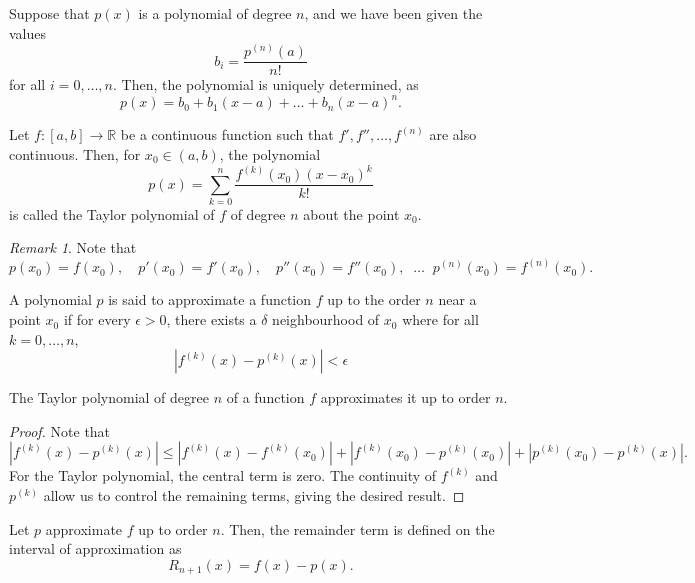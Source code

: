 \documentclass[11pt]{article}
\def\R{\mathbb{R}}
\theoremstyle{definition}
\theoremstyle{remark}
\newtheorem*{remark}{Remark}
\numberwithin{equation}{module}
\begin{document}
    \begin{lemma}
        Suppose that $p(x)$ is a polynomial of degree $n$, and we have been given the
        values \[
            b_i = \frac{p^{(n)}(a)}{n!}
        \] for all $i = 0, \dots, n$. Then, the polynomial is uniquely determined,
        as \[
            p(x) = b_0 + b_1(x - a) + \dots + b_n(x - a)^n.
        \] 
    \end{lemma}

    \begin{definition}
        Let $f\colon [a, b] \to \R$ be a continuous function such that $f', f'',
        \dots, f^{(n)}$ are also continuous. Then, for $x_0 \in (a, b)$, 
        the polynomial \[
            p(x) = \sum_{k = 0}^n \frac{f^{(k)}(x_0)(x - x_0)^k}{k!}
        \] is called the Taylor polynomial of $f$ of degree $n$ about the point
        $x_0$.
        \begin{remark}
            Note that \[
                p(x_0) = f(x_0), \quad
                p'(x_0) = f'(x_0), \quad
                p''(x_0) = f''(x_0), \;\; \dots \;\;
                p^{(n)}(x_0) = f^{(n)}(x_0).
            \] 
        \end{remark}
    \end{definition}

    \begin{definition}
        A polynomial $p$ is said to approximate a function $f$ up to the order $n$
        near a point $x_0$ if for every $\epsilon > 0$, there exists a $\delta$
        neighbourhood of $x_0$ where for all $k = 0, \dots, n$, \[
            |f^{(k)}(x) - p^{(k)}(x)| < \epsilon
        \]
    \end{definition}

    \begin{lemma}
        The Taylor polynomial of degree $n$ of a function $f$ approximates it up to 
        order $n$.
    \end{lemma}
    \begin{proof}
        Note that \[
            |f^{(k)}(x) - p^{(k)}(x)| \leq |f^{(k)}(x) - f^{(k)}(x_0)| + 
                |f^{(k)}(x_0) - p^{(k)}(x_0)| + |p^{(k)}(x_0) - p^{(k)}(x)|.
        \] For the Taylor polynomial, the central term is zero. The continuity of
        $f^{(k)}$ and $p^{(k)}$ allow us to control the remaining terms, giving the
        desired result.
    \end{proof}

    \begin{definition}[Remainder]
        Let $p$ approximate $f$ up to order $n$. Then, the remainder term is defined
        on the interval of approximation as \[
            R_{n + 1}(x) = f(x) - p(x).
        \] 
    \end{definition}
\end{document}

